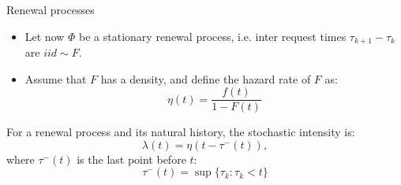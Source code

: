 \documentclass[aspectratio=169]{beamer}
\begin{document}
\begin{frame}{Renewal processes}

	\begin{itemize}
	\item Let now $\Phi$ be a \alert{stationary renewal process}, i.e. inter request times $\tau_{k+1}-\tau_k$ are $iid\sim F$.
	
	\item Assume that $F$ has a density, and define the \alert{hazard rate} of $F$ as:
	 \begin{equation*}
		\eta(t) = \frac{f(t)}{1-F(t)}
	 \end{equation*}

	\end{itemize}
	\pause
	 \begin{theorem}
		For a renewal process and its natural history, the stochastic intensity is:
		\begin{equation*}
			\lambda(t) = \eta(t-\tau^-(t)),
		\end{equation*}
		where $\tau^-(t)$ is the last point before $t$:
		\begin{equation*}
			\tau^-(t) = \sup\{\tau_k:\tau_k<t\}
		\end{equation*}
	\end{theorem}

\end{frame}
\end{document}
